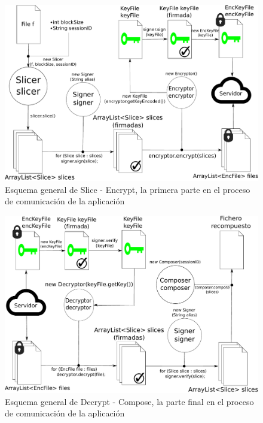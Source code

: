 \begin{figure}[ht]
  \centering
  \includegraphics[scale=0.5]{Figures/abstractA}
  \decoRule
  \caption[Slice - Encrypt]{Esquema general de Slice - Encrypt, la primera parte en el proceso de comunicación de la aplicación}
  \label{fig:abstractA}
\end{figure}

\begin{figure}[ht]
  \centering
  \includegraphics[scale=0.5]{Figures/abstractB}
  \decoRule
  \caption[Decrypt - Compose]{Esquema general de Decrypt - Compose, la parte final en el proceso de comunicación de la aplicación}
  \label{fig:abstractB}
\end{figure}
